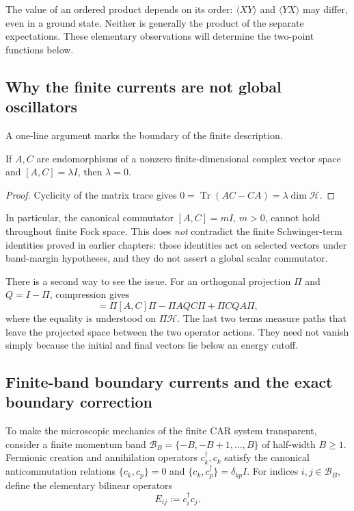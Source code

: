 The value of an ordered product depends on its order:
$\langle XY\rangle$ and $\langle YX\rangle$ may differ, even in a
ground state.  Neither is generally the product of the separate
expectations.  These elementary observations will determine the two-point
functions below.

\subsection*{Why the finite currents are not global oscillators}

A one-line argument marks the boundary of the finite description.

\begin{proposition}
\label{prop:ch19-trace-obstruction}
If $A,C$ are endomorphisms of a nonzero finite-dimensional complex
vector space and $[A,C]=\lambda I$, then $\lambda=0$.
\end{proposition}
\begin{proof}
Cyclicity of the matrix trace gives
$0=\operatorname{Tr}(AC-CA)=\lambda\dim\mathcal H$.
\end{proof}

In particular, the canonical commutator $[A,C]=mI$, $m>0$, cannot hold
throughout finite Fock space.  This does \emph{not} contradict the finite
Schwinger-term identities proved in earlier chapters: those identities
act on selected vectors under band-margin hypotheses, and they do not
assert a global scalar commutator.

There is a second way to see the issue.  For an orthogonal projection
$\Pi$ and $Q=I-\Pi$, compression gives
\begin{equation}
 [\Pi A\Pi,\Pi C\Pi]
 =\Pi[A,C]\Pi-\Pi AQ C\Pi+\Pi CQ A\Pi,
 \label{eq:ch19-compression-remainder}
\end{equation}
where the equality is understood on $\Pi\mathcal H$.  The last two
terms measure paths that leave the projected space between the two
operator actions.  They need not vanish simply because the initial
and final vectors lie below an energy cutoff.

\subsection*{Finite-band boundary currents and the exact boundary correction}

To make the microscopic mechanics of the finite CAR system transparent,
consider a finite momentum band $\mathcal B_B = \{-B, -B+1, \ldots, B\}$
of half-width $B \geq 1$.  Fermionic creation and annihilation operators
$c_k^\dagger, c_k$ satisfy the canonical anticommutation relations
$\{c_k, c_p\} = 0$ and $\{c_k, c_p^\dagger\} = \delta_{kp} I$.
For indices $i, j \in \mathcal B_B$, define the elementary bilinear operators
\begin{equation}
 E_{ij} := c_i^\dagger c_j.
 \label{eq:ch19-bilinear-def}
\end{equation}


